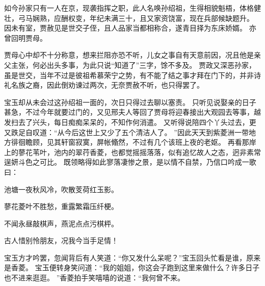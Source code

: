 如今孙家只有一人在京，现袭指挥之职，此人名唤孙绍祖，生得相貌魁梧，体格健壮，弓马娴熟，应酬权变，年纪未满三十，且又家资饶富，现在兵部候缺题升。
因未有室，贾赦见是世交子侄，且人品家当都相称合，遂青目择为东床娇婿。
亦曾回明贾母。
\par
贾母心中却不十分称意，想来拦阻亦恐不听，儿女之事自有天意前因，况且他是亲父主张，何必出头多事，为此只说“知道了”三字，馀不多及。
贾政又深恶孙家，虽是世交，当年不过是彼祖希慕荣宁之势，有不能了结之事才拜在门下的，并非诗礼名族之裔，因此倒劝谏过两次，无奈贾赦不听，也只得罢了。
\par
宝玉却从未会过这孙绍祖一面的，次日只得过去聊以塞责。
只听见说娶亲的日子甚急，不过今年就要过门的，又见邢夫人等回了贾母将迎春接出大观园去等事，越发扫去了兴头，每日痴痴呆呆的，不知作何消遣。
又听得说陪四个丫头过去，更又跌足自叹道：“从今后这世上又少了五个清洁人了。
”因此天天到紫菱洲一带地方徘徊瞻顾，见其轩窗寂寞，屏帐翛然，不过有几个该班上夜的老妪。
再看那岸上的蓼花苇叶，池内的翠荇香菱，也都觉摇摇落落，似有追忆故人之态，迥非素常逞妍斗色之可比。
既领略得如此寥落凄惨之景，是以情不自禁，乃信口吟成一歌曰：\par
\hop
池塘一夜秋风冷，吹散芰荷红玉影。
\par
蓼花菱叶不胜愁，重露繁霜压纤梗。
\par
不闻永昼敲棋声，燕泥点点污棋枰。
\par
古人惜别怜朋友，况我今当手足情！\par
\hop
宝玉方才吟罢，忽闻背后有人笑道：“你又发什么呆呢？”宝玉回头忙看是谁，原来是香菱。
宝玉便转身笑问道：“我的姐姐，你这会子跑到这里来做什么？许多日子也不进来逛逛。
”香菱拍手笑嘻嘻的说道：“我何曾不来。
